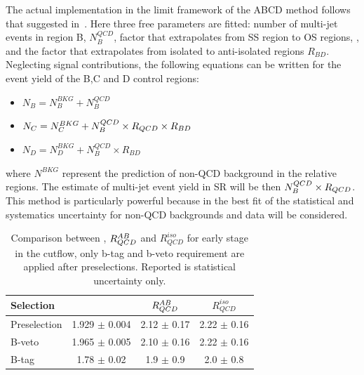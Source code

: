 The actual implementation in the limit framework of the ABCD method follows that suggested in~\cite{ABCD}.
Here three free parameters are fitted: number of multi-jet events in region B, $N_{B}^{QCD}$, factor that extrapolates from SS region to OS regions, \rqcd, and the factor that 
extrapolates from isolated to anti-isolated regions $R_{BD}$. Neglecting signal contributions, the following 
equations can be written for the event yield of the B,C and D control regions:
\begin{itemize}
\item[] $N_{B} = N_{B}^{BKG} + N_{B}^{QCD}$
\item[] $N_{C} = N_{C}^{BKG} +  N_{B}^{QCD} \times R_{QCD} \times R_{BD} $
\item[] $N_{D} =  N_{D}^{BKG} + N_{B}^{QCD} \times  R_{BD} $
\end{itemize}
where $N^{BKG}$ represent the prediction of  non-QCD background in the relative regions.
The estimate of multi-jet event yield in SR will be then $ N_{B}^{QCD} \times R_{QCD} $. This method is 
particularly powerful because in the best fit of \rqcd the statistical 
and systematics uncertainty for non-QCD backgrounds and data will be considered.


\begin{table} [tp]
	\begin{center}
	\begin{tabular}{l  c c c }
\hline 
\hline
Selection  		&  \rqcd  			&  $R_{QCD}^{AB}$  		&  $R_{QCD}^{iso}$ \\ 
\hline
Preselection 		&   1.929 $\pm$     0.004	&	2.12 $\pm$ 0.17		&	2.22 $\pm$ 0.16	\\
B-veto			&  1.965   $\pm$   0.005    	& 2.10   $\pm$	0.16 		&	2.22 $\pm$ 0.16	\\
B-tag			&  1.78    $\pm$   0.02 	& 1.9   $\pm$	0.9 		&	2.0  $\pm$ 0.8	\\
\hline
\hline
	\end{tabular}
	  \caption{Comparison between \rqcd, $R_{QCD}^{AB}$ and $R_{QCD}^{iso}$ for early stage in the cutflow, only b-tag and b-veto
	requirement are applied after preselections. Reported is statistical uncertainty only.}
	\label{table:MCsub}
	\end{center}
\end{table}


